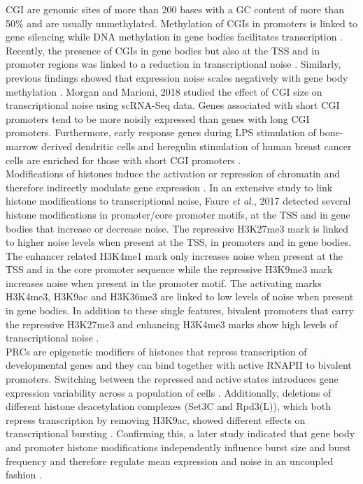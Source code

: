 \Gls{CGI} are genomic sites of more than 200 bases with a GC content of more than 50\% and are usually unmethylated. Methylation of CGIs in promoters is linked to gene silencing while DNA methylation in gene bodies facilitates transcription \citep{Portela2010}.  Recently, the presence of CGIs in gene bodies but also at the TSS and in promoter regions was linked to a reduction in transcriptional noise \citep{Faure2017}. Similarly, previous findings showed that expression noise scales negatively with gene body methylation \cite{Huh2013}. Morgan and Marioni, 2018 studied the effect of CGI size on transcriptional noise using scRNA-Seq data. Genes associated with short CGI promoters tend to be more noisily expressed than genes with long CGI promoters. Furthermore, early response genes during \gls{LPS} stimulation of bone-marrow derived dendritic cells and heregulin stimulation of human breast cancer cells are enriched for those with short CGI promoters \citep{Morgan2018}. \\

Modifications of histones induce the activation or repression of chromatin and  therefore indirectly modulate gene expression \citep{Suganuma2011}. In an extensive study to link histone modifications to transcriptional noise, Faure \textit{et al.}, 2017 detected several histone modifications in promoter/core promoter motifs, at the TSS and in gene bodies that increase or decrease noise. The repressive \gls{H3K27me3} mark is linked to higher noise levels when present at the TSS, in promoters and in gene bodies. The enhancer related \gls{H3K4me1} mark only increases noise when present at the TSS and in the core promoter sequence while the repressive \gls{H3K9me3} mark increases noise when present in the promoter motif. The activating marks \gls{H3K4me3}, \gls{H3K9ac} and \gls{H3K36me3} are linked to low levels of noise when present in gene bodies. In addition to these single features, bivalent promoters that carry the repressive \gls{H3K27me3} and enhancing \gls{H3K4me3} marks show high levels of transcriptional noise \citep{Faure2017}.\\ 

\Glspl{PRC} are epigenetic modifiers of histones that repress transcription of developmental genes \citep{Chittock2017} and they can bind together with active \gls{RNAPII} to bivalent promoters. Switching between the repressed and active states introduces gene expression variability across a population of cells \cite{Kar2017}. Additionally, deletions of different histone deacetylation complexes (Set3C and Rpd3(L)), which both repress transcription by removing H3K9ac, showed different effects on transcriptional bursting \citep{Weinberger2012}.  Confirming this, a later study indicated that gene body and promoter histone modifications independently influence burst size and burst frequency and therefore regulate mean expression and noise in an uncoupled fashion \cite{Wu2017}. \\

